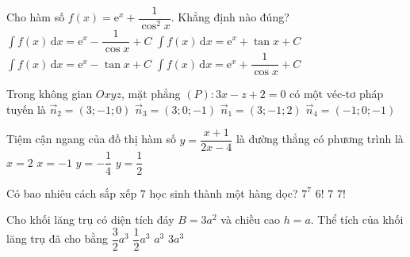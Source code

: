 \begin{ex}%
	Cho hàm số $f(x)=\mathrm{e}^x+\dfrac{1}{\cos^2x}$. Khẳng định nào đúng?
	\choice
	{$\displaystyle\int f(x) \mathrm{\,d}x=\mathrm{e}^x-\dfrac{1}{\cos x}+C$}
	{\True $\displaystyle\int f(x) \mathrm{\,d}x=\mathrm{e}^x+\tan x+C$}
	{$\displaystyle\int f(x) \mathrm{\,d}x=\mathrm{e}^x-\tan x+C$}
	{$\displaystyle\int f(x) \mathrm{\,d}x=\mathrm{e}^x+\dfrac{1}{\cos x}+C$}
\end{ex}
\begin{ex}%
	Trong không gian $Oxyz$, mặt phẳng $(P)\colon 3x-z+2=0$ có một véc-tơ pháp tuyến là
	\choice
	{$\vec{n}_2=(3;-1;0)$}
	{\True $\vec{n}_3=(3;0;-1)$}
	{$\vec{n}_1=(3;-1;2)$}
	{$\vec{n}_4=(-1;0;-1)$}
\end{ex}
\begin{ex}%
	Tiệm cận ngang của đồ thị hàm số $y=\dfrac{x+1}{2x-4}$ là đường thẳng có phương trình là
	\choice
	{$x=2$}
	{$x=-1$}
	{$y=-\dfrac{1}{4}$}
	{\True $y=\dfrac{1}{2}$}
\end{ex}
\begin{ex}%
	Có bao nhiêu cách sắp xếp $7$ học sinh thành một hàng dọc?
	\choice
	{$7^7$}
	{$6!$}
	{$7$}
	{\True $7!$}
\end{ex}
\begin{ex}%
	Cho khối lăng trụ có diện tích đáy $B=3a^2$ và chiều cao $h=a$. Thể tích của khối lăng trụ đã cho bằng
	\choice
	{$\dfrac{3}{2}a^3$}
	{$\dfrac{1}{2}a^3$}
	{$a^3$}
	{\True $3a^3$}
\end{ex}
